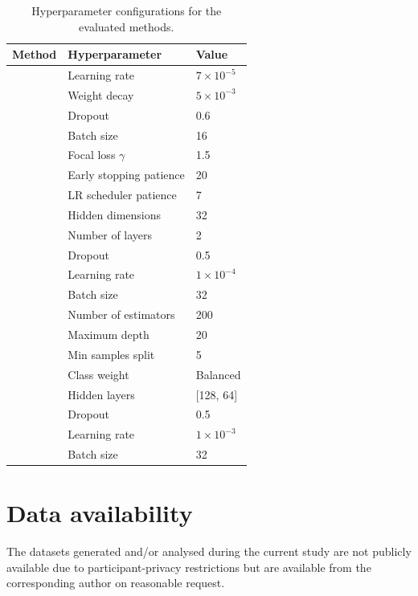\documentclass[pdflatex,sn-nature,iicol]{sn-jnl}
\begin{document}
\begin{table}[h]
  \caption{Hyperparameter configurations for the evaluated methods.}
  \label{tab:hyperparameters}
  \begin{tabular*}{\columnwidth}{@{\extracolsep{\fill}}lll@{}}
    \toprule
    Method & Hyperparameter & Value \\
    \midrule
      & Learning rate & $7 \times 10^{-5}$ \\
      & Weight decay & $5 \times 10^{-3}$ \\
      & Dropout & 0.6 \\
      & Batch size & 16 \\
      & Focal loss $\gamma$ & 1.5 \\
      & Early stopping patience & 20 \\
      & LR scheduler patience & 7 \\
    \midrule
      & Hidden dimensions & 32 \\
      & Number of layers & 2 \\
      & Dropout & 0.5 \\
      & Learning rate & $1 \times 10^{-4}$ \\
      & Batch size & 32 \\
    \midrule
      & Number of estimators & 200 \\
      & Maximum depth & 20 \\
      & Min samples split & 5 \\
      & Class weight & Balanced \\
    \midrule
      & Hidden layers & [128, 64] \\
      & Dropout & 0.5 \\
      & Learning rate & $1 \times 10^{-3}$ \\
      & Batch size & 32 \\
    \bottomrule
  \end{tabular*}
\end{table}

\backmatter

\section*{Data availability}
The datasets generated and/or analysed during the current study are not publicly available due to participant-privacy restrictions but are available from the corresponding author on reasonable request.
\end{document}
